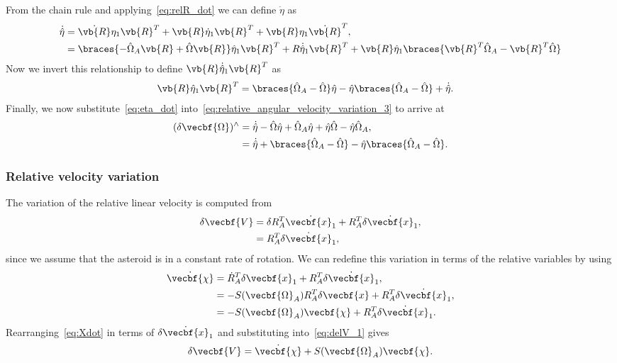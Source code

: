 \documentclass[11pt, reqno]{article}    %
\begin{document}
From the chain rule and applying~\cref{eq:relR_dot} we can define \( \dot{\eta} \) as
\begin{align}\label{eq:eta_dot_1}
    \dot{\hat{\eta}} &= \dot{\vb{R}} \eta_1 \vb{R}^T + \vb{R} \dot{\eta}_1 \vb{R}^T + \vb{R} \eta_1 \dot{\vb{R}}^T , \nonumber\\
                     &= \braces{- \hat{\Omega}_A \vb{R} + \hat{\Omega} \vb{R}} \hat{\eta}_1 \vb{R}^T + R \dot{\hat{\eta}}_1 \vb{R}^T + \vb{R} \hat{\eta}_1 \braces{\vb{R}^T \hat{\Omega}_A - \vb{R}^T \hat{\Omega}}
\end{align}
Now we invert this relationship to define \( \vb{R} \dot{\hat{\eta}}_1 \vb{R}^T \) as
\begin{align}\label{eq:eta_dot}
    \vb{R} \hat{\eta}_1 \vb{R}^T &= \braces{\hat{\Omega}_A - \hat{\Omega}} \hat{\eta} - \hat{\eta} \braces{\hat{\Omega}_A - \hat{\Omega}} + \dot{\hat{\eta}} .
\end{align}
Finally, we now substitute~\cref{eq:eta_dot} into~\cref{eq:relative_angular_velocity_variation_3} to arrive at
\begin{align}\label{eq:rel_ang_vel_var}
    (\delta \vecbf{\Omega})^\wedge &= \dot{\hat{\eta}} - \hat{\Omega} \hat{\eta} + \hat{\Omega}_A \hat{\eta} + \hat{\eta} \hat{\Omega} - \hat{\eta} \hat{\Omega}_A , \\
                                   &= \dot{\hat{\eta}} + \braces{\hat{\Omega}_A - \hat{\Omega}} - \hat{\eta} \braces{\hat{\Omega}_A - \hat{\Omega}} . 
\end{align}
\subsubsection{Relative velocity variation}
The variation of the relative linear velocity is computed from 
\begin{align}\label{eq:delV_1}
    \delta \vecbf{V} &= \delta R_A^T \dot{\vecbf{x}_1} + R_A^T \delta \dot{\vecbf{x}}_1 , \nonumber \\
    &= R_A^T \delta \dot{\vecbf{x}}_1 ,
\end{align}
since we assume that the asteroid is in a constant rate of rotation.
We can redefine this variation in terms of the relative variables by using
\begin{align}\label{eq:Xdot}
    \dot{\vecbf{\chi}} &= \dot{R}_A^T \delta \vecbf{x}_1 + R_A^T \delta \dot{\vecbf{x}}_1 , \nonumber \\
    &= -S(\vecbf{\Omega}_A) R_A^T \delta \vecbf{x} + R_A^T \delta \dot{\vecbf{x}}_1 ,\nonumber \\
    &= -S(\vecbf{\Omega}_A) \vecbf{\chi} + R_A^T \delta \dot{\vecbf{x}}_1 .
\end{align}
Rearranging~\cref{eq:Xdot} in terms of \( \delta \dot{\vecbf{x}}_1\) and substituting into~\cref{eq:delV_1} gives
\begin{align}\label{eq:relative_velocity_variation}
    \delta \vecbf{V} = \dot{\vecbf{\chi}} + S(\vecbf{\Omega}_A) \vecbf{\chi} .
\end{align}
\end{document}
